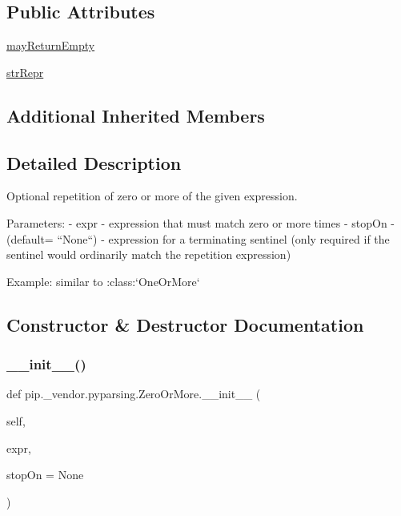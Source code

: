\subsection*{Public Attributes}
\begin{DoxyCompactItemize}
\item 
\hyperlink{classpip_1_1__vendor_1_1pyparsing_1_1ZeroOrMore_a99eb4982dc4cb75ccd5965581c82bbe1}{may\+Return\+Empty}
\item 
\hyperlink{classpip_1_1__vendor_1_1pyparsing_1_1ZeroOrMore_afa3e9a7a723041868402257d25ee0f42}{str\+Repr}
\end{DoxyCompactItemize}
\subsection*{Additional Inherited Members}


\subsection{Detailed Description}
\begin{DoxyVerb}Optional repetition of zero or more of the given expression.

Parameters:
 - expr - expression that must match zero or more times
 - stopOn - (default= ``None``) - expression for a terminating sentinel
      (only required if the sentinel would ordinarily match the repetition
      expression)

Example: similar to :class:`OneOrMore`
\end{DoxyVerb}
 

\subsection{Constructor \& Destructor Documentation}
\mbox{\label{classpip_1_1__vendor_1_1pyparsing_1_1ZeroOrMore_afe89075c5a720dcbdf81cb5d6a72880f}} 
\subsubsection{\texorpdfstring{\+\_\+\+\_\+init\+\_\+\+\_\+()}{\_\_init\_\_()}}
{\footnotesize\ttfamily def pip.\+\_\+vendor.\+pyparsing.\+Zero\+Or\+More.\+\_\+\+\_\+init\+\_\+\+\_\+ (\begin{DoxyParamCaption}\item[{}]{self,  }\item[{}]{expr,  }\item[{}]{stop\+On = {\ttfamily None} }\end{DoxyParamCaption})}



